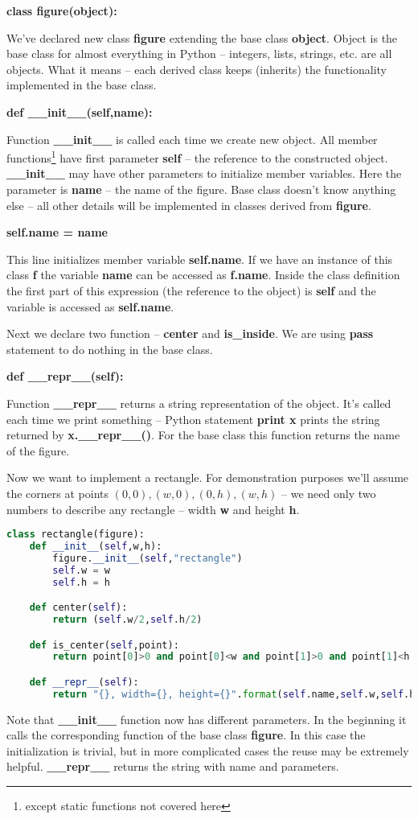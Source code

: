 \textbf{class figure(object):}

We've declared new class \textbf{figure} extending the base class
\textbf{object}. Object is the base class for almost everything in Python
 -- integers, lists, strings, etc. are all objects. What it means --
each derived class keeps (inherits) the functionality implemented
in the base class.

\textbf{ def \_\_init\_\_(self,name):}

Function \textbf{\_\_init\_\_} is called each time we create new object.
All member functions\footnote{except static functions not covered here} have
first parameter \textbf{self} -- the reference to the constructed object.
\textbf{\_\_init\_\_} may have other parameters to initialize member variables.
Here the parameter is \textbf{name} -- the name of the figure. Base class
doesn't know anything else -- all other details will be implemented in
classes derived from \textbf{figure}.

\textbf{self.name = name}

This line initializes member variable \textbf{self.name}. If we have an
instance of this class \textbf{f} the variable \textbf{name} can be
accessed as \textbf{f.name}.
Inside the class definition the first
part of this expression (the reference to the object) is \textbf{self}
and the variable is accessed as \textbf{self.name}.

Next we declare two function -- \textbf{center} and \textbf{is\_inside}.
We are using \textbf{pass} statement
to do nothing in the base class.

\textbf{def \_\_repr\_\_(self):}

Function \textbf{\_\_repr\_\_} returns a string representation of the
object. It's called each time we print something -- Python statement
\textbf{print x} prints the string returned by \textbf{x.\_\_repr\_\_()}.
For the base class this function returns the name of the figure.


Now we want to implement a rectangle. For demonstration purposes
we'll assume the corners at points $(0,0), (w,0), (0,h), (w,h)$ --
we need only two numbers to describe any rectangle -- width \textbf{w}
and height \textbf{h}.

\begin{lstlisting}[language=Python,style=codelst2,caption={Python: derived class (rectangle)}]
class rectangle(figure):
    def __init__(self,w,h):
        figure.__init__(self,"rectangle")
        self.w = w
        self.h = h

    def center(self):
        return (self.w/2,self.h/2)

    def is_center(self,point):
        return point[0]>0 and point[0]<w and point[1]>0 and point[1]<h

    def __repr__(self):
        return "{}, width={}, height={}".format(self.name,self.w,self.h)
\end{lstlisting}
Note that \textbf{\_\_init\_\_} function now has different
parameters. In the beginning it calls the corresponding function
of the base class \textbf{figure}. In this case the initialization
is trivial, but in more complicated cases the reuse may be
extremely helpful. \textbf{\_\_repr\_\_} returns the string with
name and parameters.

